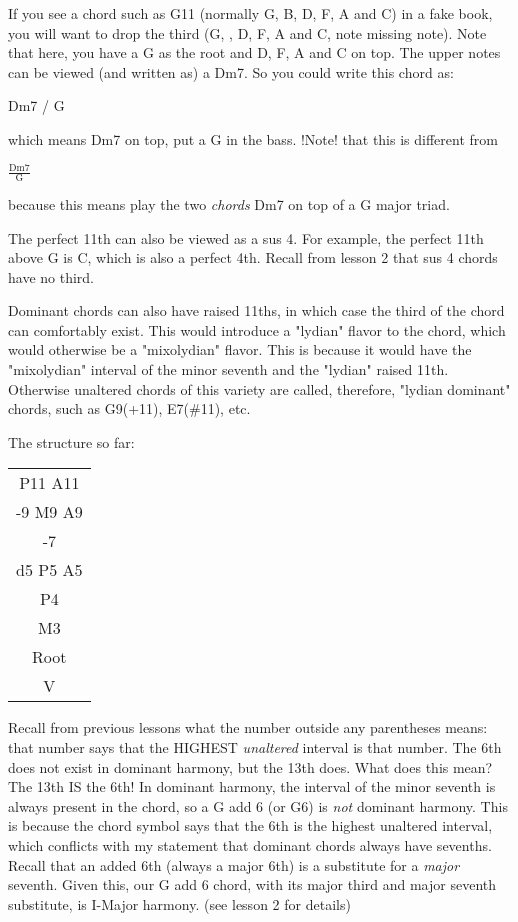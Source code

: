 If you see a chord such as G11 (normally G, B, D, F, A and C) in a fake book,
you will want to drop the third (G,  , D, F, A and C, note missing note). Note 
that here, you have a G as the root and D, F, A and C on top. The upper notes 
can be viewed (and written as) a Dm7. So you could write this chord as:

\begin{center}
  Dm7 / G
\end{center}


which means Dm7 on top, put a G in the bass. !Note! that this is different from

\begin{center}
  $\frac{\text{Dm7}}{\text{G}}$
\end{center}


because this means play the two \emph{chords} Dm7 on top of a G major triad.

The perfect 11th can also be viewed as a sus 4. For example, the perfect 11th
above G is C, which is also a perfect 4th. Recall from lesson 2 that sus 4
chords have no third.

Dominant chords can also have raised 11ths, in which case the third of the
chord can comfortably exist. This would introduce a "lydian" flavor to the
chord, which would otherwise be a "mixolydian" flavor. This is because it
would have the "mixolydian" interval of the minor seventh and the "lydian"
raised 11th. Otherwise unaltered chords of this variety are called, therefore,
"lydian dominant" chords, such as G9(+11), E7(\#11), etc.

The structure so far:
\begin{center}
\begin{tabular}{ | c | }
	\hline
	P11 A11\\
	-9 M9 A9\\
	-7\\
	d5 P5 A5\\
	P4\\
	M3\\
	Root\\
	\hline
  V\\
  \hline
\end{tabular}
\end{center}

Recall from previous lessons what the number outside any parentheses means:
that number says that the HIGHEST \emph{unaltered} interval is that number. The
6th does not exist in dominant harmony, but the 13th does. What does this
mean? The 13th IS the 6th! In dominant harmony, the interval of the minor
seventh is always present in the chord, so a G add 6 (or G6) is \emph{not} dominant
harmony. This is because the chord symbol says that the 6th is the highest
unaltered interval, which conflicts with my statement that dominant chords
always have sevenths. Recall that an added 6th (always a major 6th) is a
substitute for a \emph{major} seventh. Given this, our G add 6 chord, with its
major third and major seventh substitute, is I-Major harmony. (see lesson
2 for details)

